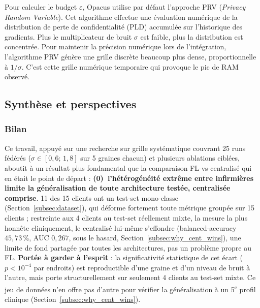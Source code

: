 \documentclass{article}
\begin{document}
Pour calculer le budget $\varepsilon$, Opacus utilise par défaut l'approche PRV
(\textit{Privacy Random Variable}). Cet algorithme effectue une évaluation numérique
de la distribution de perte de confidentialité (PLD) accumulée sur l'historique des
gradients. Plus le multiplicateur de bruit $\sigma$ est faible, plus la distribution
est concentrée. Pour maintenir la précision numérique lors de l'intégration,
l'algorithme PRV génère une grille discrète beaucoup plus dense, proportionnelle à
$1/\sigma$. C'est cette grille numérique temporaire qui provoque le pic de RAM observé.

\subsection{Synthèse et perspectives}
\label{subsec:synthesis}

\subsubsection{Bilan}

Ce travail, appuyé sur une recherche sur grille systématique couvrant 25 runs fédérés
($\sigma \in [0{,}6;\, 1{,}8]$ sur 5 graines chacun) et plusieurs ablations ciblées,
aboutit à un résultat plus fondamental que la comparaison FL-vs-centralisé qui en était
le point de départ : \textbf{(0)~l'hétérogénéité extrême entre infirmières limite la
généralisation de toute architecture testée, centralisée comprise}. 11 des 15 clients
ont un test-set mono-classe (Section~\ref{subsec:dataset}), qui déforme fortement
toute métrique groupée sur 15 clients ; restreinte aux 4 clients au test-set réellement
mixte, la mesure la plus honnête cliniquement, le centralisé lui-même s'effondre
(balanced-accuracy $45{,}73\,\%$, AUC $0{,}267$, sous le hasard,
Section~\ref{subsec:why_cent_wins}), une limite de fond partagée par toutes les
architectures, pas un problème propre au FL. \textbf{Portée à garder à l'esprit} : la
significativité statistique de cet écart ($p<10^{-4}$ par endroits) est reproductible
d'une graine et d'un niveau de bruit à l'autre, mais porte structurellement sur
seulement 4 clients au test-set mixte. Ce jeu de données n'en offre pas d'autre pour
vérifier la généralisation à un 5\textsuperscript{e} profil clinique
(Section~\ref{subsec:why_cent_wins}).
\end{document}
